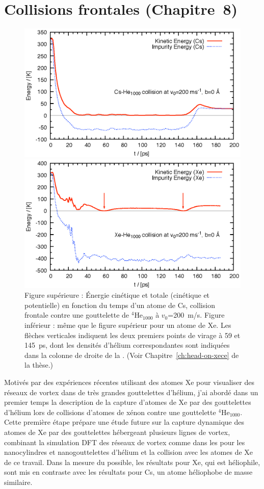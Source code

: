 	\section*{Collisions frontales \small(Chapitre~8)}
		\begin{figure}
			\centerline{\includegraphics[width=\linewidth]{fig3-Cs-He}} 
			\centerline{\includegraphics[width=\linewidth]{fig3-Xe-He}}
			\caption{\label{fig3-headon}Figure supérieure : Énergie cinétique et totale (cinétique et potentielle) en fonction du temps d'un atome de Cs, collision frontale contre une gouttelette de $^4$He$_{1000}$ à $v_0$=200~m/s. Figure inférieur : même que le figure supérieur pour un atome de Xe. Les flèches verticales indiquent les deux premiers points de virage à 59 et 145~ps, dont les densités d'hélium correspondantes sont indiquées dans la colonne de droite de la .  (Voir Chapitre~\ref{ch:head-on-xece} de la thèse.)}
		\end{figure}	
		Motivés par des expériences récentes utilisant des atomes Xe pour visualiser des réseaux de vortex dans de très grandes gouttelettes d'hélium\citep{Gom14,Jon16}, j'ai abordé dans un premier temps la description de la capture d'atomes de Xe par des gouttelettes d'hélium lors de collisions d'atomes de xénon contre une gouttelette $^4$He$_{1000}$. 
		Cette première étape prépare une étude future sur la capture dynamique des atomes de Xe par des gouttelettes hébergeant plusieurs lignes de vortex, combinant la simulation DFT des réseaux de vortex comme dans les  pour les nanocylindres et nanogouttelettes d'hélium et la collision avec les atomes de Xe de ce travail. 
		Dans la mesure du possible, les résultats pour Xe, qui est  héliophile, sont mis en contraste avec les résultats pour Cs, un atome héliophobe de masse similaire.
		
